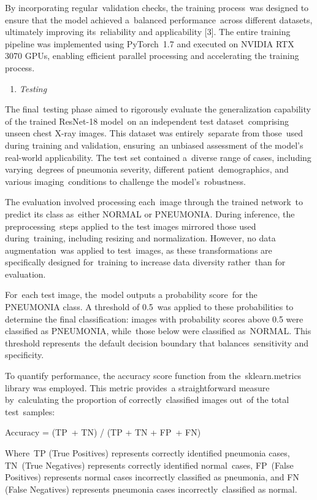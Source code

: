 \documentclass[
  twocolumn,
  10pt,
  a4paper,
  journal
]{IEEEtran}
\begin{document}
By incorporating regular~validation checks, the training process~was
designed to ensure that the model achieved a~balanced performance~across
different datasets, ultimately improving its~reliability and
applicability {[}3{]}. The entire training pipeline was implemented
using PyTorch~1.7 and executed on NVIDIA RTX 3070 GPUs, enabling
efficient parallel processing and accelerating the training process.

\begin{enumerate}
\def\labelenumi{\Alph{enumi}.}
\setcounter{enumi}{5}
\item
  \emph{Testing}
\end{enumerate}

The final~testing phase aimed to rigorously evaluate the generalization
capability of the trained ResNet-18 model~on an independent test
dataset~comprising unseen chest X-ray images. This dataset was
entirely~separate from those~used during training and validation,
ensuring~an unbiased assessment of the model's
real-world applicability. The test set contained a~diverse range of
cases, including varying~degrees of pneumonia severity, different
patient~demographics, and various imaging~conditions to challenge the
model's~robustness.

The evaluation involved processing each~image through the trained
network~to predict its class as~either NORMAL or PNEUMONIA. During
inference, the preprocessing~steps applied to the test images mirrored
those used during~training, including resizing and normalization.
However, no data augmentation~was applied to test~images, as these
transformations are specifically designed for~training to increase data
diversity rather~than for evaluation.

For~each test image, the~model outputs a probability score~for the
PNEUMONIA class. A threshold of 0.5~was applied to these probabilities
to determine the final classification: images with probability scores
above 0.5 were classified as PNEUMONIA, while~those below were
classified as~NORMAL. This threshold represents~the default decision
boundary that balances~sensitivity and specificity.

To quantify performance, the accuracy score function from
the~sklearn.metrics library was employed. This metric provides~a
straightforward measure by~calculating the proportion of
correctly~classified images out~of the total test~samples:

Accuracy = (TP~+ TN) / (TP + TN + FP~+ FN)

Where~TP (True Positives) represents correctly identified pneumonia
cases, TN~(True Negatives) represents correctly identified normal~cases,
FP~(False Positives) represents normal cases incorrectly classified as
pneumonia, and FN (False Negatives) represents pneumonia cases
incorrectly~classified as normal.
\end{document}
